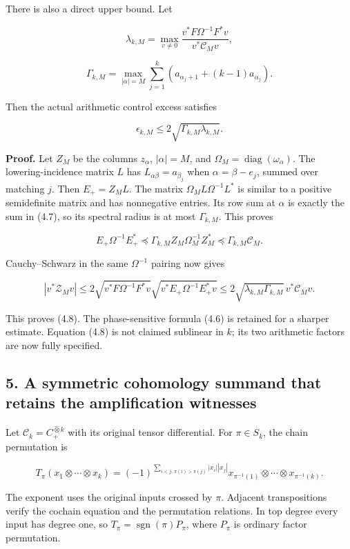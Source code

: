 \documentclass[
]{article}
\begin{document}
There is also a direct upper bound. Let

\[\lambda_{k,M}=\max_{v\ne0}\frac{v^*F\Omega^{-1}F^*v}{v^*\mathcal C_Mv},\]

\[\Gamma_{k,M}=\max_{|\alpha|=M}\sum_{j=1}^k\left(a_{\alpha_j+1}+(k-1)a_{\alpha_j}\right).\tag{4.7}\]

Then the actual arithmetic control excess satisfies

\[\boxed{\epsilon_{k,M}\le2\sqrt{\Gamma_{k,M}\lambda_{k,M}}.}\tag{4.8}\]

\textbf{Proof.} Let \(Z_M\) be the columns \(z_\alpha\), \(|\alpha|=M\),
and \(\Omega_M=\operatorname{diag}(\omega_\alpha)\). The
lowering-incidence matrix \(L\) has \(L_{\alpha\beta}=a_{\beta_j}\) when
\(\alpha=\beta-e_j\), summed over matching \(j\). Then \(E_+=Z_ML\). The
matrix \(\Omega_ML\Omega^{-1}L^*\) is similar to a positive semidefinite
matrix and has nonnegative entries. Its row sum at \(\alpha\) is exactly
the sum in (4.7), so its spectral radius is at most \(\Gamma_{k,M}\).
This proves

\[E_+\Omega^{-1}E_+^*\preceq
\Gamma_{k,M}Z_M\Omega_M^{-1}Z_M^*
\preceq\Gamma_{k,M}\mathcal C_M.\]

Cauchy--Schwarz in the same \(\Omega^{-1}\) pairing now gives

\[|v^*\mathcal Z_Mv|
\le2\sqrt{v^*F\Omega^{-1}F^*v}\sqrt{v^*E_+\Omega^{-1}E_+^*v}
\le2\sqrt{\lambda_{k,M}\Gamma_{k,M}}\,v^*\mathcal C_Mv.\]

This proves (4.8). The phase-sensitive formula (4.6) is retained for a
sharper estimate. Equation (4.8) is not claimed sublinear in \(k\); its
two arithmetic factors are now fully specified.

\subsection{5. A symmetric cohomology summand that retains the
amplification
witnesses}\label{a-symmetric-cohomology-summand-that-retains-the-amplification-witnesses}

Let \(\mathcal C_k=C_+^{\widehat\otimes k}\) with its original tensor
differential. For \(\pi\in S_k\), the chain permutation is

\[T_\pi(x_1\otimes\cdots\otimes x_k)
=(-1)^{\sum_{i<j,\,\pi(i)>\pi(j)}|x_i||x_j|}
 x_{\pi^{-1}(1)}\otimes\cdots\otimes x_{\pi^{-1}(k)}.\tag{5.1}\]

The exponent uses the original inputs crossed by \(\pi\). Adjacent
transpositions verify the cochain equation and the permutation
relations. In top degree every input has degree one, so
\(T_\pi=\operatorname{sgn}(\pi)P_\pi\), where \(P_\pi\) is ordinary
factor permutation.
\end{document}
